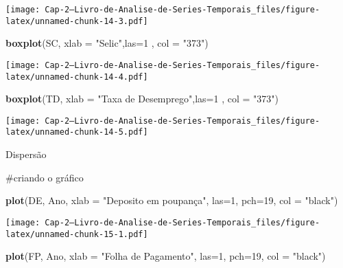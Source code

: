 \documentclass[]{article}
\newenvironment{Shaded}{\begin{snugshade}}{\end{snugshade}}
\newcommand{\DataTypeTok}[1]{\textcolor[rgb]{0.13,0.29,0.53}{#1}}
\newcommand{\DecValTok}[1]{\textcolor[rgb]{0.00,0.00,0.81}{#1}}
\newcommand{\KeywordTok}[1]{\textcolor[rgb]{0.13,0.29,0.53}{\textbf{#1}}}
\newcommand{\NormalTok}[1]{#1}
\newcommand{\StringTok}[1]{\textcolor[rgb]{0.31,0.60,0.02}{#1}}
\begin{document}
\texttt{[image: Cap-2---Livro-de-Analise-de-Series-Temporais\_files/figure-latex/unnamed-chunk-14-3.pdf]}

\begin{Shaded}
\begin{Highlighting}[]
\KeywordTok{boxplot}\NormalTok{(SC,}
         \DataTypeTok{xlab =} \StringTok{"Selic"}\NormalTok{,}\DataTypeTok{las=}\DecValTok{1}\NormalTok{ , }\DataTypeTok{col =} \StringTok{"373"}\NormalTok{)}
\end{Highlighting}
\end{Shaded}

\texttt{[image: Cap-2---Livro-de-Analise-de-Series-Temporais\_files/figure-latex/unnamed-chunk-14-4.pdf]}

\begin{Shaded}
\begin{Highlighting}[]
\KeywordTok{boxplot}\NormalTok{(TD,}
         \DataTypeTok{xlab =} \StringTok{"Taxa de Desemprego"}\NormalTok{,}\DataTypeTok{las=}\DecValTok{1}\NormalTok{ , }\DataTypeTok{col =} \StringTok{"373"}\NormalTok{)}
\end{Highlighting}
\end{Shaded}

\texttt{[image: Cap-2---Livro-de-Analise-de-Series-Temporais\_files/figure-latex/unnamed-chunk-14-5.pdf]}

Dispersão

\#criando o gráfico

\begin{Shaded}
\begin{Highlighting}[]
\KeywordTok{plot}\NormalTok{(DE, Ano,}
         \DataTypeTok{xlab =} \StringTok{"Deposito em poupança"}\NormalTok{, }\DataTypeTok{las=}\DecValTok{1}\NormalTok{, }\DataTypeTok{pch=}\DecValTok{19}\NormalTok{, }\DataTypeTok{col =} \StringTok{"black"}\NormalTok{)}
\end{Highlighting}
\end{Shaded}

\texttt{[image: Cap-2---Livro-de-Analise-de-Series-Temporais\_files/figure-latex/unnamed-chunk-15-1.pdf]}

\begin{Shaded}
\begin{Highlighting}[]
\KeywordTok{plot}\NormalTok{(FP, Ano,}
         \DataTypeTok{xlab =} \StringTok{"Folha de Pagamento"}\NormalTok{, }\DataTypeTok{las=}\DecValTok{1}\NormalTok{, }\DataTypeTok{pch=}\DecValTok{19}\NormalTok{, }\DataTypeTok{col =} \StringTok{"black"}\NormalTok{)}
\end{Highlighting}
\end{Shaded}
\end{document}
